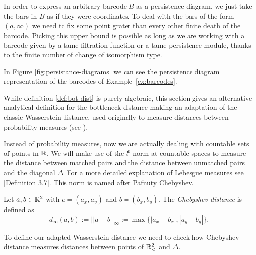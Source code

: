 \begin{example} \label{ex:persistence-diagrams}
    In order to express an arbitrary barcode $ B $ as a persistence diagram, we just take the bars in $ B $ as if they were coordinates. To deal with the bars of the form $ (a, \infty) $ we need to fix some point grater than every other finite death of the barcode. Picking this upper bound is possible as long as we are working with a barcode given by a tame filtration function or a tame persistence module, thanks to the finite number of change of isomorphism type.

    In Figure \ref{fig:persistance-diagrams} we can see the persistence diagram representation of the barcodes of Example~\ref{ex:barcodes}.
    
\end{example}

While definition \ref{def:bot-dist} is purely algebraic, this section gives an alternative analytical definition for the bottleneck distance making an adaptation of the classic Wasserstein distance, used originally to measure distances between probability measures (see \cite{givens}).

Instead of probability measures, now we are actually dealing with countable sets of points in $ \mathbb R $. We will make use of the $ l^p $ norm at countable spaces to measure the distance between matched pairs and the distance between unmatched pairs and the diagonal $ \Delta $. For a more detailed explanation of Lebesgue measures see \cite{rudin}[Definition 3.7]. This norm is named after Pafnuty Chebyshev.

\begin{definition}
    Let $ a, b \in \mathbb R^2 $ with $a = (a_x, a_y) $ and $ b = (b_x, b_y) $. The {\it Chebyshev distance} is defined as
    \begin{equation}
        d_\infty(a, b) := ||a-b||_{\infty} := \max \{|a_x - b_x|, |a_y - b_y|\}.
    \end{equation}
\end{definition}

To define our adapted Wasserstein distance we need to check how Chebyshev distance measures distances between points of $ \mathbb{R}_<^2 $ and $ \Delta $.

